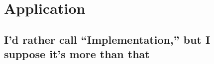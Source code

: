 \chapter{Application}

\section{I'd rather call ``Implementation,'' but I suppose it's more than that}

